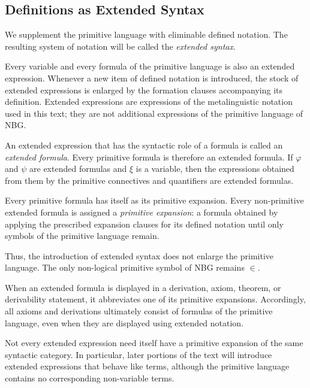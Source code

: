 \subsection{Definitions as Extended Syntax} \label{sec:definitions}


We supplement the primitive language with
eliminable defined notation. The resulting system of notation will be
called the \emph{extended syntax}.

Every variable and every formula of the primitive language is also an
extended expression. Whenever a new item of defined notation is introduced,
the stock of extended expressions is enlarged by the formation clauses
accompanying its definition. Extended expressions are expressions of the
metalinguistic notation used in this text; they are not additional
expressions of the primitive language of NBG.

An extended expression that has the syntactic role of a formula is called
an \emph{extended formula}. Every primitive formula is therefore an
extended formula. If \(\varphi\) and \(\psi\) are extended formulas and \(\xi\) is a
variable, then the expressions obtained from them by the primitive
connectives and quantifiers are extended formulas.


Every primitive formula has itself as its primitive expansion. Every
non-primitive extended formula is assigned a \emph{primitive expansion}: a
formula obtained by applying the prescribed expansion clauses for its
defined notation until only symbols of the primitive language remain.

Thus, the introduction of extended syntax does not enlarge the primitive
language. The only non-logical primitive symbol of NBG remains \(\in\).

When an extended formula is displayed in a derivation, axiom, theorem, or
derivability statement, it abbreviates one of its primitive expansions.
Accordingly, all axioms and derivations ultimately consist of formulas of
the primitive language, even when they are displayed using extended
notation.


Not every extended expression need itself have a primitive expansion of the
same syntactic category. In particular, later portions of the text will
introduce extended expressions that behave like terms, although the
primitive language contains no corresponding non-variable terms.

